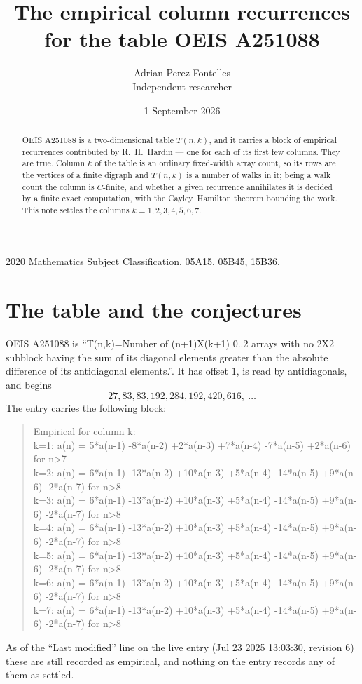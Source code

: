 \documentclass[11pt,a4paper]{article}
\title{The empirical column recurrences for the table OEIS A251088}
\author{Adrian Perez Fontelles\\ \small Independent researcher}
\date{1 September 2026}
\theoremstyle{plain}
\theoremstyle{definition}
\begin{document}
\maketitle

\begin{abstract}
OEIS A251088 is a two-dimensional table $T(n,k)$, and it carries a block of empirical
recurrences contributed by R.~H.~Hardin --- one for each of its first few columns. They are
true. Column $k$ of the table is an ordinary fixed-width array count, so its rows are the
vertices of a finite digraph and $T(n,k)$ is a number of walks in it; being a walk count the
column is $C$-finite, and whether a given recurrence annihilates it is decided by a finite
exact computation, with the Cayley--Hamilton theorem bounding the work. This note settles the
columns $k=1, 2, 3, 4, 5, 6, 7$.
\end{abstract}

\noindent\small 2020 Mathematics Subject Classification. 05A15, 05B45, 15B36.\normalsize

\section{The table and the conjectures}

OEIS A251088 is ``T(n,k)=Number of (n+1)X(k+1) 0..2 arrays with no 2X2 subblock having the sum of its diagonal elements greater than the absolute difference of its antidiagonal elements.''. It has offset $1$, is
read by antidiagonals, and begins
\[
27, 83, 83, 192, 284, 192, 420, 616,\ \dots
\]
The entry carries the following block:
\begin{quote}\small
Empirical for column k:\\
k=1: a(n) = 5*a(n-1) -8*a(n-2) +2*a(n-3) +7*a(n-4) -7*a(n-5) +2*a(n-6) for n>7\\
k=2: a(n) = 6*a(n-1) -13*a(n-2) +10*a(n-3) +5*a(n-4) -14*a(n-5) +9*a(n-6) -2*a(n-7) for n>8\\
k=3: a(n) = 6*a(n-1) -13*a(n-2) +10*a(n-3) +5*a(n-4) -14*a(n-5) +9*a(n-6) -2*a(n-7) for n>8\\
k=4: a(n) = 6*a(n-1) -13*a(n-2) +10*a(n-3) +5*a(n-4) -14*a(n-5) +9*a(n-6) -2*a(n-7) for n>8\\
k=5: a(n) = 6*a(n-1) -13*a(n-2) +10*a(n-3) +5*a(n-4) -14*a(n-5) +9*a(n-6) -2*a(n-7) for n>8\\
k=6: a(n) = 6*a(n-1) -13*a(n-2) +10*a(n-3) +5*a(n-4) -14*a(n-5) +9*a(n-6) -2*a(n-7) for n>8\\
k=7: a(n) = 6*a(n-1) -13*a(n-2) +10*a(n-3) +5*a(n-4) -14*a(n-5) +9*a(n-6) -2*a(n-7) for n>8\\
\end{quote}
As of the ``Last modified'' line on the live entry (Jul 23 2025 13:03:30, revision 6) these are still
recorded as empirical, and nothing on the entry records any of them as settled.
\end{document}
